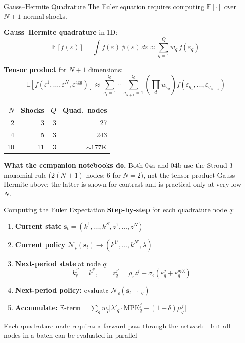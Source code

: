 \documentclass[aspectratio=169,11pt]{beamer}
\newcommand{\emphc}[1]{\textcolor{harvardcrimson}{#1}}
\newcommand{\E}[1]{\mathbb{E}\!\left[#1\right]}
\begin{document}
\begin{frame}{Gauss--Hermite Quadrature}
\footnotesize
The Euler equation requires computing $\E{\cdot}$ over $N+1$ normal shocks.

\textbf{Gauss--Hermite quadrature} in 1D:
\[
\E{f(\varepsilon)} = \int f(\varepsilon)\, \phi(\varepsilon)\,d\varepsilon \approx \sum_{q=1}^{Q} w_q \, f(\varepsilon_q)
\]

\textbf{Tensor product} for $N+1$ dimensions:
\[
\E{f(\varepsilon^1, \ldots, \varepsilon^N, \varepsilon^{\text{agg}})} \approx \sum_{q_1=1}^{Q}\cdots\sum_{q_{N+1}=1}^{Q} \left(\prod_{d} w_{q_d}\right) f(\varepsilon_{q_1}, \ldots, \varepsilon_{q_{N+1}})
\]

\begin{center}
\begin{tabular}{rrrr}
\toprule
$N$ & \textbf{Shocks} & $Q$ & \textbf{Quad.\ nodes} \\
\midrule
2 & 3 & 3 & 27 \\
4 & 5 & 3 & 243 \\
10 & 11 & 3 & $\sim 177$K \\
\bottomrule
\end{tabular}
\end{center}

\vspace{0.2em}
{\footnotesize \textbf{What the companion notebooks do.} Both 04a and 04b use the \emphc{Stroud-3 monomial rule} ($2(N+1)$ nodes; $6$ for $N=2$), not the tensor-product Gauss--Hermite above; the latter is shown for contrast and is practical only at very low $N$.}
\end{frame}

\begin{frame}{Computing the Euler Expectation}
\textbf{Step-by-step} for each quadrature node $q$:

\vspace{0.3em}
\begin{enumerate}
    \item \textbf{Current state} $\bm{s}_t = (k^1, \ldots, k^N, z^1, \ldots, z^N)$
    \item \textbf{Current policy} $\mathcal{N}_\rho(\bm{s}_t) \to (k^{1\prime}, \ldots, k^{N\prime}, \lambda)$ 
    \item \textbf{Next-period state} at node $q$:
    \[
    k^{j\prime}_q = k^{j\prime}, \qquad z^{j\prime}_q = \rho_z z^j + \sigma_e(\varepsilon^j_q + \varepsilon^{\text{agg}}_q)
    \]
    \item \textbf{Next-period policy:} evaluate $\mathcal{N}_\rho(\bm{s}_{t+1,q})$
    \item \textbf{Accumulate:} $\text{E-term} = \sum_q w_q \bigl[\lambda'_q \cdot \text{MPK}^j_q - (1-\delta)\mu^{j\prime}_q\bigr]$
\end{enumerate}

\vspace{0.3em}
{\small Each quadrature node requires a \emphc{forward pass} through the network---but all nodes in a batch can be evaluated in parallel.}
\end{frame}
\end{document}
